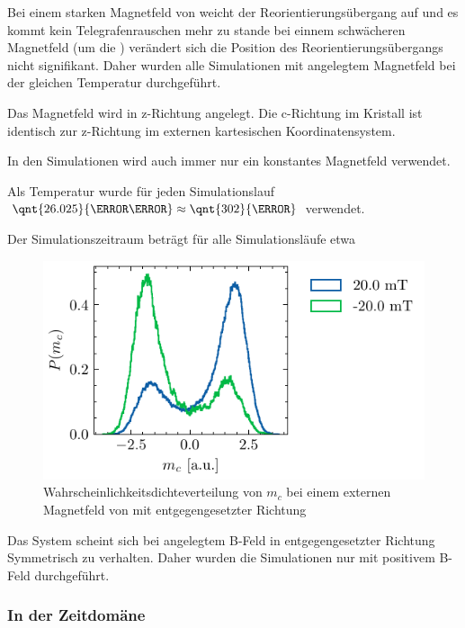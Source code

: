 \documentclass[main.tex]{subfiles}
\begin{document}
Bei einem starken Magnetfeld von  weicht der Reorientierungsübergang auf und es kommt kein Telegrafenrauschen mehr zu stande bei einnem schwächeren Magnetfeld (um die ) verändert sich die Position des Reorientierungsübergangs nicht signifikant. Daher wurden alle Simulationen mit angelegtem Magnetfeld bei der gleichen Temperatur durchgeführt.

Das Magnetfeld wird in z-Richtung angelegt. Die c-Richtung im Kristall ist identisch zur z-Richtung im externen kartesischen Koordinatensystem.

In den Simulationen wird auch immer nur ein konstantes Magnetfeld verwendet.

Als Temperatur wurde für jeden Simulationslauf \( \qnt{26.025}{\milli\electronvolt} \approx \qnt{302}{\kelvin}\) verwendet.

Der Simulationszeitraum beträgt für alle Simulationsläufe etwa 

\begin{figure}[H]
    \centering
    \includegraphics{bilder/plots/Bz_sign_comparison/20mT_hist_comp.pdf}
    \caption{Wahrscheinlichkeitsdichteverteilung von \(m_c\) bei einem externen Magnetfeld von  mit entgegengesetzter Richtung}\label{fig:bc-sign-hist}
\end{figure}

Das System scheint sich bei angelegtem B-Feld in entgegengesetzter Richtung Symmetrisch zu verhalten. Daher wurden die Simulationen nur mit positivem B-Feld durchgeführt.


\subsubsection{In der Zeitdomäne}
\end{document}
